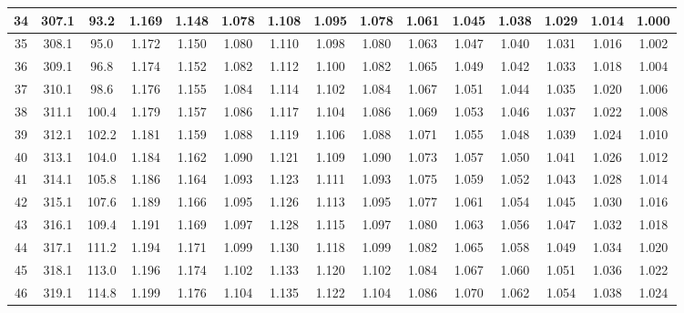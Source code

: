 \documentclass[12pt,a4paper,twoside]{article}
\begin{document}
\begin{center}
\begin{longtable}{ c c c | c c c c c c c c c c c c}
 34 & 307.1 & 93.2 & 1.169 & 1.148 & 1.078 & 1.108 & 1.095 & 1.078 & 1.061 & 1.045 & 1.038 & 1.029 & 1.014 & 1.000 \\ \hline   
 
 35 & 308.1 & 95.0 & 1.172 & 1.150 & 1.080 & 1.110 & 1.098 & 1.080 & 1.063 & 1.047 & 1.040 & 1.031 & 1.016 & 1.002 \\ \hline   
 
 36 & 309.1 & 96.8 & 1.174 & 1.152 & 1.082 & 1.112 & 1.100 & 1.082 & 1.065 & 1.049 & 1.042 & 1.033 & 1.018 & 1.004 \\ \hline   
 
 37 & 310.1 & 98.6 & 1.176 & 1.155 & 1.084 & 1.114 & 1.102 & 1.084 & 1.067 & 1.051 & 1.044 & 1.035 & 1.020 & 1.006 \\ \hline   
 
 38 & 311.1 & 100.4 & 1.179 & 1.157 & 1.086 & 1.117 & 1.104 & 1.086 & 1.069 & 1.053 & 1.046 & 1.037 & 1.022 & 1.008 \\ \hline   
 
 39 & 312.1 & 102.2 & 1.181 & 1.159 & 1.088 & 1.119 & 1.106 & 1.088 & 1.071 & 1.055 & 1.048 & 1.039 & 1.024 & 1.010 \\ \hline   
 
 40 & 313.1 & 104.0 & 1.184 & 1.162 & 1.090 & 1.121 & 1.109 & 1.090 & 1.073 & 1.057 & 1.050 & 1.041 & 1.026 & 1.012 \\ \hline   
 
 41 & 314.1 & 105.8 & 1.186 & 1.164 & 1.093 & 1.123 & 1.111 & 1.093 & 1.075 & 1.059 & 1.052 & 1.043 & 1.028 & 1.014 \\ \hline   
 
 42 & 315.1 & 107.6 & 1.189 & 1.166 & 1.095 & 1.126 & 1.113 & 1.095 & 1.077 & 1.061 & 1.054 & 1.045 & 1.030 & 1.016 \\ \hline   
 
 43 & 316.1 & 109.4 & 1.191 & 1.169 & 1.097 & 1.128 & 1.115 & 1.097 & 1.080 & 1.063 & 1.056 & 1.047 & 1.032 & 1.018 \\ \hline   
 
 44 & 317.1 & 111.2 & 1.194 & 1.171 & 1.099 & 1.130 & 1.118 & 1.099 & 1.082 & 1.065 & 1.058 & 1.049 & 1.034 & 1.020 \\ \hline   
 
 45 & 318.1 & 113.0 & 1.196 & 1.174 & 1.102 & 1.133 & 1.120 & 1.102 & 1.084 & 1.067 & 1.060 & 1.051 & 1.036 & 1.022 \\ \hline   
 
 46 & 319.1 & 114.8 & 1.199 & 1.176 & 1.104 & 1.135 & 1.122 & 1.104 & 1.086 & 1.070 & 1.062 & 1.054 & 1.038 & 1.024 \\ \hline   
 

\end{longtable}
\end{center}
\end{document}
